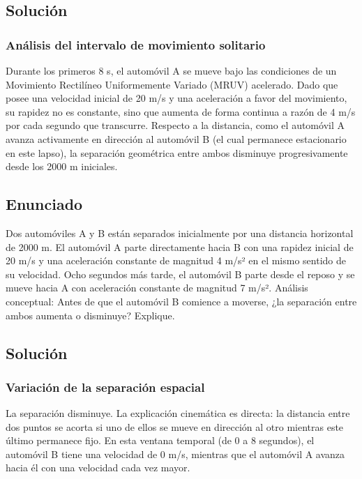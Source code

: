 \documentclass[12pt, a4paper]{article}
\begin{document}
\subsection*{Solución}

\subsubsection*{Análisis del intervalo de movimiento solitario}
Durante los primeros 8 s, el automóvil A se mueve bajo las condiciones de un Movimiento Rectilíneo Uniformemente Variado (MRUV) acelerado. Dado que posee una velocidad inicial de 20 m/s y una aceleración a favor del movimiento, su rapidez no es constante, sino que aumenta de forma continua a razón de 4 m/s por cada segundo que transcurre. 
Respecto a la distancia, como el automóvil A avanza activamente en dirección al automóvil B (el cual permanece estacionario en este lapso), la separación geométrica entre ambos disminuye progresivamente desde los 2000 m iniciales.

\newpage
\subsection*{Enunciado}
 Dos automóviles A y B están separados inicialmente por una distancia horizontal de 2000 m. El automóvil A parte directamente hacia B con una rapidez inicial de 20 m/s y una aceleración constante de magnitud 4 m/s² en el mismo sentido de su velocidad. Ocho segundos más tarde, el automóvil B parte desde el reposo y se mueve hacia A con aceleración constante de magnitud 7 m/s².
 Análisis conceptual: Antes de que el automóvil B comience a moverse, ¿la separación entre ambos aumenta o disminuye? Explique.

\subsection*{Solución}

\subsubsection*{Variación de la separación espacial}
La separación disminuye. La explicación cinemática es directa: la distancia entre dos puntos se acorta si uno de ellos se mueve en dirección al otro mientras este último permanece fijo. En esta ventana temporal (de 0 a 8 segundos), el automóvil B tiene una velocidad de 0 m/s, mientras que el automóvil A avanza hacia él con una velocidad cada vez mayor.
\end{document}
